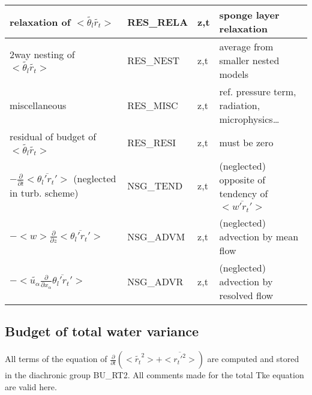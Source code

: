 \begin{longtable}[c]{|p{}|p{}|p{}|p{}|}
{\rm relaxation of }$<\tilde{\theta_l}\tilde{r_t}>$                 & RES\_RELA & z,t & sponge layer relaxation \\\hline
{\rm 2way nesting of }$<\tilde{\theta_l}\tilde{r_t}>$               & RES\_NEST & z,t & average from smaller nested models \\\hline
{\rm miscellaneous}                                                 & RES\_MISC & z,t & ref. pressure term, radiation, microphysics\ldots \\\hline
{\rm residual of budget of} $<\tilde{\theta_l}\tilde{r_t}>$         & RES\_RESI & z,t & must be zero \\\hline
$-\frac{\partial }{\partial t}<\overline{\theta_l'r_t'}>$ (neglected in turb. scheme) & NSG\_TEND & z,t & (neglected) opposite of tendency of $<\overline{w'r_t'}>$ \\\hline
$-<w>\frac{\partial}{\partial z}<\overline{\theta_l'r_t'}>$         & NSG\_ADVM & z,t & (neglected) advection by mean flow \\\hline
$-<\tilde{u_\alpha}\frac{\partial}{\partial x_\alpha}\overline{\theta_l'r_t'}>$  & NSG\_ADVR & z,t & (neglected) advection by resolved flow \\\hline
\end{longtable}


\subsection{Budget of total water variance}


All terms of the equation of $\frac{\partial}{\partial t} (<\tilde{r_t}^2> + <\overline{r_t'^2}>)$ are
computed and stored in the diachronic group BU\_RT2. 
All comments made for the total Tke equation are valid here.\\

